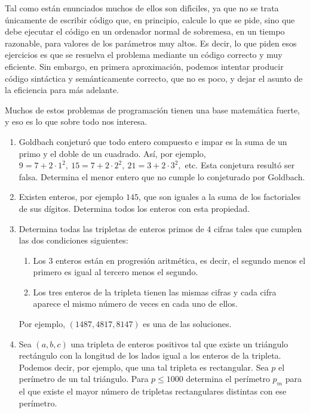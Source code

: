 \begin{enumerate}
Tal como est\'an enunciados muchos de ellos son dif\'{\i}ciles, ya que no se
trata \'unicamente de escribir c\'odigo que, en principio, calcule lo que se
pide, sino que debe ejecutar el c\'odigo en un ordenador normal de sobremesa, 
en un tiempo razonable, para valores de los par\'ametros muy altos. Es decir, lo
que piden esos ejercicios es que se resuelva el problema mediante un c\'odigo
correcto y muy eficiente. Sin embargo, en primera aproximaci\'on, podemos
intentar producir c\'odigo sint\'actica y sem\'anticamente correcto, que no es
poco, y dejar el asunto de la eficiencia para m\'as adelante. 

Muchos de estos problemas de programaci\'on tienen una base matem\'atica fuerte,
y eso es lo que sobre todo nos interesa.

\begin{enumerate}

\item Goldbach conjeturó que todo entero compuesto e impar es la suma de un primo y el doble de un cuadrado. Así, por ejemplo, $9=7+2\cdot 1^2,\ 15=7+2\cdot 2^2,\ 21=3+2\cdot 3^2,$ etc. Esta conjetura resultó ser falsa. Determina el menor entero que no cumple lo conjeturado por Goldbach.

\item  Existen enteros, por ejemplo $145$,  que son iguales a la suma de los factoriales de sus dígitos. Determina todos los enteros con esta propiedad. 

\item Determina todas las tripletas de enteros primos de $4$ cifras tales que cumplen las dos condiciones siguientes:
\begin{enumerate}
\item Los $3$ enteros están en progresión aritmética, es decir, el segundo menos el primero es igual al tercero menos el segundo.
\item  Los tres enteros de la tripleta tienen las mismas cifras y cada cifra aparece el mismo número de veces en cada uno de ellos.
\end{enumerate}
Por ejemplo, $(1487, 4817, 8147)$ es una de las soluciones.

\item  Sea $(a,b,c)$ una tripleta de enteros positivos tal que existe un triángulo rectángulo con la longitud de los lados igual a los enteros de la tripleta.  Podemos decir, por ejemplo, que una tal tripleta es rectangular. Sea $p$ el perímetro de un tal triángulo. Para $p\le 1000$ determina el perímetro $p_m$ para el que existe el mayor número de tripletas rectangulares distintas con ese perímetro. 


\end{enumerate}
\end{enumerate}
